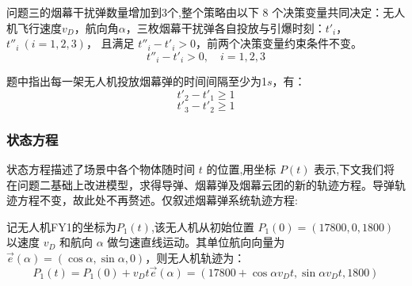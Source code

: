 \documentclass[withoutpreface,bwprint]{cumcmthesis}
\numberwithin{equation}{section} %
\numberwithin{figure}{section} %
\numberwithin{table}{section}  %
\begin{document}
问题三的烟幕干扰弹数量增加到3个,整个策略由以下 $ 8$ 个决策变量共同决定：无人机飞行速度$v_D$，航向角$\alpha$，三枚烟幕干扰弹各自投放与引爆时刻：$t'_i$，$t''_i~(i=1,2,3)$，
且满足 $t''_i - t'_i > 0$，前两个决策变量约束条件不变。
\begin{equation}
t''_i - t'_i > 0, \quad i = 1, 2, 3
\end{equation}

题中指出每一架无人机投放烟幕弹的时间间隔至少为1$s$，有：
\begin{equation}
t'_2 - t'_1 \ge 1
\end{equation}
\begin{equation}
t'_3 - t'_2 \ge 1
\end{equation}

\vspace{-2em}
\subsubsection{状态方程}

状态方程描述了场景中各个物体随时间 $t$ 的位置,用坐标 ${P}(t)$ 表示,下文我们将在问题二基础上改进模型，求得导弹、烟幕弹及烟幕云团的新的轨迹方程。导弹轨迹方程不变，故此处不再赘述。仅叙述烟幕弹系统轨迹方程:




记无人机FY1的坐标为${P}_{1}(t)$,该无人机从初始位置 ${P}_{1}(0) = (17800, 0, 1800)$ 以速度 $v_D$ 和航向 $\alpha$ 做匀速直线运动。其单位航向向量为 $\vec{e}(\alpha) = (\cos \alpha, \sin \alpha, 0)$，则无人机轨迹为：
\begin{equation}
    {P}_{1}(t) = {P}_{1}(0) + v_D t \vec{e}(\alpha)=(17800+\cos{\alpha}v_Dt,\sin{\alpha}v_Dt,1800)
\end{equation}
\end{document}
